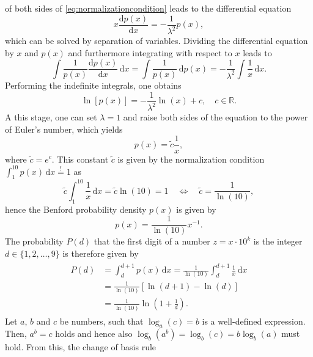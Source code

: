 \documentclass[a4paper,10pt, twocolumn]{article}
\begin{document}
of both sides of \cref{eq:normalizationcondition} leads to the differential equation \begin{equation}
	x\frac{\mathrm{d}p(x)}{\mathrm{d}x} = -\frac{1}{\lambda^2}p(x),
\end{equation} which can be solved by separation of variables. Dividing the differential equation by $x$ and $p(x)$ and furthermore integrating with respect to $x$ leads to \begin{equation}
\int \frac{1}{p(x)}\frac{\mathrm{d}p(x)}{\mathrm{d}x}\,\mathrm{d}x = \int \frac{1}{p(x)}\,\mathrm{d}p(x) =  -\frac{1}{\lambda^2}\int \frac{1}{x}\,\mathrm{d}x.
\end{equation} Performing the indefinite integrals, one obtains \begin{equation}
\ln[p(x)] = -\frac{1}{\lambda^2}\ln(x) + c, \quad c \in \mathbb{R}.
\end{equation} A this stage, one can set $\lambda =1$ and raise both sides of the equation to the power of Euler's number, which yields \begin{equation}
p(x) = \tilde{c}\frac{1}{x},
\end{equation} where $\tilde{c} = e^c$. This constant $\tilde{c}$ is given by the normalization condition $\int_{1}^{10}p(x)\,\mathrm{d}x\overset{!}{=}1$ as \begin{equation}
\tilde{c}\int_{1}^{10}\frac{1}{x}\,\mathrm{d}x = \tilde{c}\ln(10) = 1 \quad \Leftrightarrow \quad \tilde{c} = \frac{1}{\ln(10)},
\end{equation} hence the Benford probability density $p(x)$ is given by \begin{equation}
p(x) = \frac{1}{\ln(10)}x^{-1}.
\end{equation} The probability $P(d)$ that the first digit of a number $z = x\cdot 10^k$ is the integer $d \in \{1,2,\dots,9\}$ is therefore given by \begin{align}\begin{aligned}
P(d) &= \int_{d}^{d+1}p(x)\,\mathrm{d}x = \frac{1}{\ln(10)}\int_{d}^{d+1}\frac{1}{x}\,\mathrm{d}x \\ &= \frac{1}{\ln(10)}[\ln(d+1)-\ln(d)] \\ &= \frac{1}{\ln(10)}\ln\left(1+\frac{1}{d}\right).
\end{aligned}\end{align} Let $a$, $b$ and $c$ be numbers, such that $\log_a(c) = b$ is a well-defined expression. Then, $a^b = c$ holds and hence also $\log_b(a^b) = \log_b(c) = b\log_b(a)$ must hold. From this, the change of basis rule \begin{equation}

\end{equation}
\end{document}

